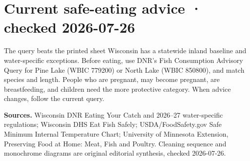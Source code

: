\section{Current safe-eating advice · checked 2026-07-26}
\Advisory

\begin{center}
\end{center}

\begin{teloshazard}{The query beats the printed sheet}
Wisconsin has a statewide inland baseline and water-specific exceptions.
Before eating, use DNR's Fish Consumption Advisory Query for Pine Lake
(WBIC 779200) or North Lake (WBIC 850800), and match species and length. People
who are pregnant, may become pregnant, are breastfeeding, and children need
the more protective category. When advice changes, follow the current query.
\end{teloshazard}

{\footnotesize\textbf{Sources.} Wisconsin DNR Eating Your Catch and 2026--27
water-specific regulations; Wisconsin DHS Eat Fish Safely; USDA/FoodSafety.gov
Safe Minimum Internal Temperature Chart; University of Minnesota Extension,
Preserving Food at Home: Meat, Fish and Poultry. Cleaning sequence and
monochrome diagrams are original editorial synthesis, checked 2026-07-26.}

